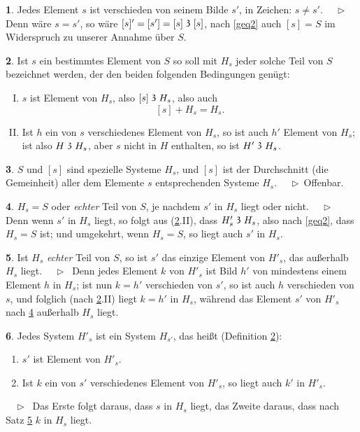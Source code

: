 \documentclass[leqno,hidelinks,10pt]{article}
\theoremstyle{definition}
\newtheorem{satz}{\protect\satzname}
\newtheorem{deff}[satz]{\protect\deffname}
\newcommand{\satzname}{}
\newcommand{\deffname}{}
\renewcommand{\satzname}{\hspace{-4pt}.\ Satz}%
\renewcommand{\deffname}{\hspace{-4pt}.\ Definition}%
\renewcommand{\satzname}{\hspace{-4pt}.\ Theorem}%
\renewcommand{\deffname}{\hspace{-4pt}.\ Definition}%
\newcommand\Beweis{\medskip \newline $ \phantom{'.'} \rhd \ $}%
\newcommand\beweis{ $ \phantom{'.'} \rhd \ $}%
\newcommand\TeilVon{\mathrel{\raisebox{0.45ex}{$\mathfrak{3}$}}}
\newcommand{\sref}[1]{\underline{\ref{#1}}}%
\begin{document}
\begin{paracol}{2}
\begin{leftcolumn}
\begin{satz}\label{gthm2}
Jedes Element $s$ ist verschieden von seinem Bilde $s'$, in Zeichen: $s \neq s'$.
\Beweis
Denn wäre $s = s'$, so wäre $[s]' = [s'] = [s] \TeilVon [s]$, nach \eqref{geq2}
auch $[s] = S$ im Widerspruch zu unserer Annahme über $S$.
\end{satz}

\newpage

\begin{deff}\label{gdef3}
Ist $s$ ein bestimmtes Element von $S$ so soll mit $H_s$ jeder solche Teil von
$S$ bezeichnet werden, der den beiden folgenden Bedingungen genügt:
\begin{enumerate}[I.]
\item $s$ ist Element von $H_s$, also $[s] \TeilVon H_s$, also auch
\[
	[s] + H_s = H_s.
\]
\item Ist $h$ ein von $s$ verschiedenes Element von $H_s$, so ist auch $h'$
Element von $H_s$; ist also $H \TeilVon H_s$, aber $s$ nicht in $H$ enthalten,
so ist $H' \TeilVon H_s$.
\end{enumerate}
\end{deff}

\begin{satz}\label{gthm4}
$S$ und $[s]$ sind spezielle Systeme $H_s$, und $[s]$ ist der Durchschnitt
(die Gemeinheit) aller dem Elemente $s$ entsprechenden Systeme $H_s$.
\Beweis Offenbar.
\end{satz}

\begin{satz}\label{gthm5}
$H_s = S$ oder \textit{echter} Teil von $S$, je nachdem $s'$ in $H_s$ liegt oder nicht.
\Beweis
Denn wenn $s'$ in $H_s$ liegt, so folgt aus (\sref{gdef3}.II),
dass $H'_s \TeilVon H_s$, also nach \eqref{geq2}, dass $H_s = S$ ist; und umgekehrt,
wenn $H_s = S$, so liegt auch $s'$ in $H_s$.
\end{satz}

\begin{satz}\label{gthm6}
Ist $H_s$ \emph{echter} Teil von $S$, so ist $s'$ das einzige Element von $H'_s$,
das außerhalb $H_s$ liegt.
\Beweis
Denn jedes Element $k$ von $H'_s$ ist Bild $h'$ von mindestens einem Element $h$
in $H_s$; ist nun $k=h'$ verschieden von $s'$, so ist auch $h$ verschieden von $s$,
und folglich (nach \sref{gdef3}.II) liegt $k = h'$ in $H_s$,
während das Element $s'$ von $H'_s$ nach \sref{gthm5} außerhalb $H_s$ liegt.
\end{satz}

\begin{satz}\label{gthm7}
Jedes System $H'_s$ ist ein System $H_{s'}$, das heißt (Definition \sref{gdef3}):
\begin{enumerate}[I'.]
    \item $s'$ ist Element von $H'_s$.
    \item Ist $k$ ein von $s'$ verschiedenes Element von $H'_s$, so liegt auch $k'$ in $H'_s$.
\end{enumerate}
\beweis
Das Erste folgt daraus, dass $s$ in $H_s$ liegt, das Zweite daraus,
dass nach Satz \sref{gthm6} $k$ in $H_s$ liegt.
\end{satz}


\end{leftcolumn}
\end{paracol}
\end{document}
